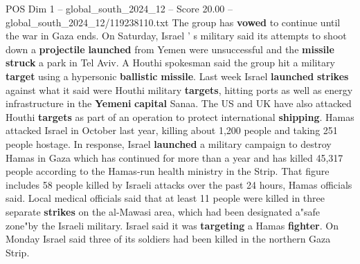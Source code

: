 \begin{textsample}{POS Dim 1 – global\_south\_2024\_12 – Score 20.00 – global\_south\_2024\_12/119238110.txt}
The group has \textbf{vowed} to continue until the war in Gaza ends.
On Saturday, Israel ' s military said its attempts to shoot down a \textbf{projectile} \textbf{launched} from Yemen were unsuccessful and the \textbf{missile} \textbf{struck} a park in Tel Aviv.
A Houthi spokesman said the group hit a military \textbf{target} using a hypersonic \textbf{ballistic} \textbf{missile}.
Last week Israel \textbf{launched} \textbf{strikes} against what it said were Houthi military \textbf{targets}, hitting ports as well as energy infrastructure in the \textbf{Yemeni} \textbf{capital} Sanaa.
The US and UK have also attacked Houthi \textbf{targets} as part of an operation to protect international \textbf{shipping}.
Hamas attacked Israel in October last year, killing about 1,200 people and taking 251 people hostage.
In response, Israel \textbf{launched} a military campaign to destroy Hamas in Gaza which has continued for more than a year and has killed 45,317 people according to the Hamas-run health ministry in the Strip.
That figure includes 58 people killed by Israeli attacks over the past 24 hours, Hamas officials said.
Local medical officials said that at least 11 people were killed in three separate \textbf{strikes} on the al-Mawasi area, which had been designated a"safe zone"by the Israeli military.
Israel said it was \textbf{targeting} a Hamas \textbf{fighter}.
On Monday Israel said three of its soldiers had been killed in the northern Gaza Strip.

\end{textsample}
